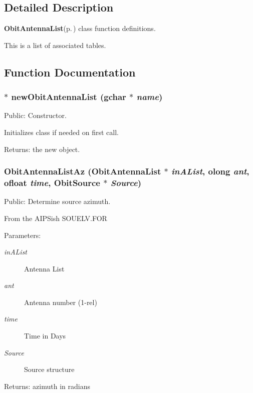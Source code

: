 \subsection{Detailed Description}
{\bf Obit\-Antenna\-List}{\rm (p.\,\pageref{structObitAntennaList})} class function definitions. 

This is a list of associated tables.

\subsection{Function Documentation}
\subsubsection{$\ast$ new\-Obit\-Antenna\-List (gchar $\ast$ {\em name})}\label{ObitAntennaList_8c_a6}


Public: Constructor. 

Initializes class if needed on first call. \begin{Desc}
\item[Returns:]the new object. \end{Desc}
\subsubsection{ Obit\-Antenna\-List\-Az ({\bf Obit\-Antenna\-List} $\ast$ {\em in\-AList}, {\bf olong} {\em ant}, {\bf ofloat} {\em time}, {\bf Obit\-Source} $\ast$ {\em Source})}\label{ObitAntennaList_8c_a12}


Public: Determine source azimuth. 

From the AIPSish SOUELV.FOR \begin{Desc}
\item[Parameters:]
\begin{description}
\item[{\em in\-AList}]Antenna List \item[{\em ant}]Antenna number (1-rel) \item[{\em time}]Time in Days \item[{\em Source}]Source structure \end{description}
\end{Desc}
\begin{Desc}
\item[Returns:]azimuth in radians \end{Desc}

